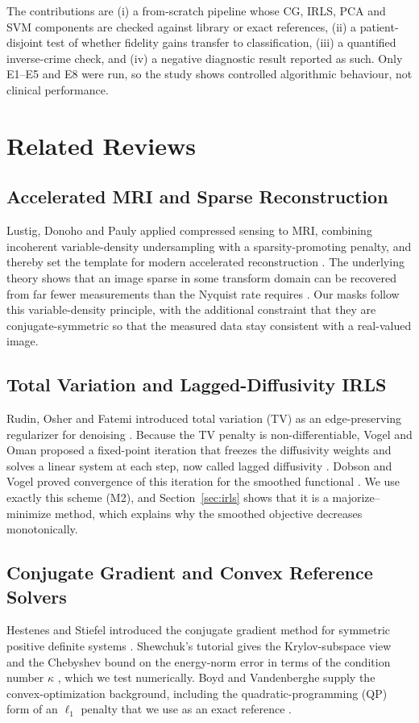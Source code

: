 \documentclass[conference,a4paper]{IEEEtran}
\begin{document}
The contributions are (i) a from-scratch pipeline whose CG, IRLS, PCA and SVM components are checked against library or exact references, (ii) a patient-disjoint test of whether fidelity gains transfer to classification, (iii) a quantified inverse-crime check, and (iv) a negative diagnostic result reported as such. Only E1--E5 and E8 were run, so the study shows controlled algorithmic behaviour, not clinical performance.

\section{Related Reviews}\label{sec:related}

\subsection{Accelerated MRI and Sparse Reconstruction}
Lustig, Donoho and Pauly applied compressed sensing to MRI, combining incoherent variable-density undersampling with a sparsity-promoting penalty, and thereby set the template for modern accelerated reconstruction \cite{lustig}. The underlying theory shows that an image sparse in some transform domain can be recovered from far fewer measurements than the Nyquist rate requires \cite{donoho}. Our masks follow this variable-density principle, with the additional constraint that they are conjugate-symmetric so that the measured data stay consistent with a real-valued image.

\subsection{Total Variation and Lagged-Diffusivity IRLS}
Rudin, Osher and Fatemi introduced total variation (TV) as an edge-preserving regularizer for denoising \cite{rudin}. Because the TV penalty is non-differentiable, Vogel and Oman proposed a fixed-point iteration that freezes the diffusivity weights and solves a linear system at each step, now called lagged diffusivity \cite{vogel}. Dobson and Vogel proved convergence of this iteration for the smoothed functional \cite{dobson}. We use exactly this scheme (M2), and Section~\ref{sec:irls} shows that it is a majorize--minimize method, which explains why the smoothed objective decreases monotonically.

\subsection{Conjugate Gradient and Convex Reference Solvers}
Hestenes and Stiefel introduced the conjugate gradient method for symmetric positive definite systems \cite{hestenes}. Shewchuk's tutorial gives the Krylov-subspace view and the Chebyshev bound on the energy-norm error in terms of the condition number $\kappa$ \cite{shewchuk}, which we test numerically. Boyd and Vandenberghe supply the convex-optimization background, including the quadratic-programming (QP) form of an $\ell_1$ penalty that we use as an exact reference \cite{boyd}.
\end{document}
